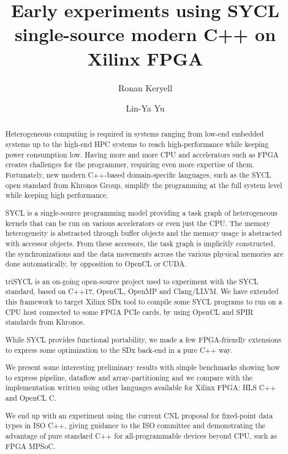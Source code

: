 \documentclass[sigplan, review, authordraft]{acmart}
\begin{document}
\title{Early experiments using SYCL single-source modern C++ on Xilinx FPGA}

\author{Ronan Keryell}

\author{Lin-Ya Yu}



\begin{abstract}
  Heterogeneous computing is required in systems ranging from low-end
  embedded systems up to the high-end HPC systems to reach
  high-performance while keeping power consumption low. Having more
  and more CPU and accelerators such as FPGA creates challenges for
  the programmer, requiring even more expertise of them. Fortunately,
  new modern C++-based domain-specific languages, such as the SYCL
  open standard from Khronos Group, simplify the programming at the
  full system level while keeping high performance.

  SYCL is a single-source programming model providing a task graph of
  heterogeneous kernels that can be run on various accelerators or
  even just the CPU. The memory heterogeneity is abstracted through
  buffer objects and the memory usage is abstracted with accessor
  objects. From these accessors, the task graph is implicitly
  constructed, the synchronizations and the data movements across the
  various physical memories are done automatically, by opposition to
  OpenCL or CUDA.

  triSYCL is an on-going open-source project used to experiment with
  the SYCL standard, based on C++17, OpenCL, OpenMP and Clang/LLVM.
  We have extended this framework to target Xilinx SDx tool to compile
  some SYCL programs to run on a CPU host connected to some FPGA PCIe
  cards, by using OpenCL and SPIR standards from Khronos.

  While SYCL provides functional portability, we made a few
  FPGA-friendly extensions to express some optimization to the SDx
  back-end in a pure C++ way.

  We present some interesting preliminary results with simple
  benchmarks showing how to express pipeline, dataflow and
  array-partitioning and we compare with the implementation written
  using other languages available for Xilinx FPGA: HLS C++ and OpenCL
  C.

  We end up with an experiment using the current CNL proposal for
  fixed-point data types in ISO C++, giving guidance to the ISO
  committee and demonstrating the advantage of pure standard C++ for
  all-programmable devices beyond CPU, such as FPGA MPSoC.
\end{abstract}
\end{document}
